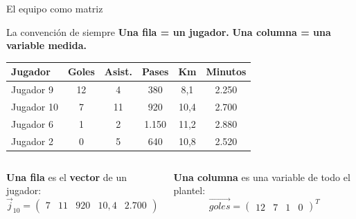 \documentclass[aspectratio=169,10pt]{beamer}
\begin{document}
\begin{frame}{El equipo como matriz}

\begin{block}{La convención de siempre}
\textbf{Una fila = un jugador.} \quad \textbf{Una columna = una variable medida.}
\end{block}

\vspace{0.3cm}
\begin{center}
\begin{tabular}{lccccc}
\toprule
\textbf{Jugador} & \textbf{Goles} & \textbf{Asist.} & \textbf{Pases} & \textbf{Km} & \textbf{Minutos} \\
\midrule
Jugador 9  & 12 & 4  & 380  & 8{,}1  & 2.250 \\
Jugador 10 & 7  & 11 & 920  & 10{,}4 & 2.700 \\
Jugador 6  & 1  & 2  & 1.150 & 11{,}2 & 2.880 \\
Jugador 2  & 0  & 5  & 640  & 10{,}8 & 2.520 \\
\bottomrule
\end{tabular}
\end{center}

\vspace{0.4cm}
\begin{columns}[T]
\textbf{Una fila} es el \textbf{vector} de un jugador:
$$\vec{j}_{10} = \begin{pmatrix} 7 & 11 & 920 & 10{,}4 & 2.700 \end{pmatrix}$$

\textbf{Una columna} es una variable de todo el plantel:
$$\vec{goles} = \begin{pmatrix} 12 & 7 & 1 & 0 \end{pmatrix}^T$$
\end{columns}
\end{frame}
\end{document}

